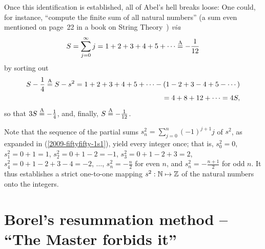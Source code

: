 Once this identification is established, all of Abel's hell breaks loose:
One could, for instance, ``compute the finite sum of all natural numbers''
(a sum even mentioned on page~22 in a book on String Theory~\cite{polchinski_1998}) {\it via}
\begin{equation}
S  =
\sum_{j=0}^\infty j = 1+2+3+4+5 + \cdots \stackrel{{\rm A}}{=} - \frac{1}{12}
\label{2016-m-ch-ds-natnumser}
\end{equation}
by sorting out
\begin{equation}
\begin{split}
S - \frac{1}{4}\stackrel{{\rm A}}{=}
S-s^2  = 1+2+3+4+5 + \cdots -
(1-2+3-4+5-\cdots )   \\
= 4 + 8+ 12 +  \cdots = 4 S
,
\label{2016-m-ch-ds-natnumser2}
\end{split}
\end{equation}
so that  $3 S
\stackrel{{\rm A}}{=}  - \frac{1}{4}$,
and, finally, $S
\stackrel{{\rm A}}{=}  - \frac{1}{12}$.

Note that the sequence of the partial sums $s^2_n=\sum_{j=0}^n (-1)^{j+1} j $
of $s^2$, as expanded in (\ref{2009-fiftyfifty-1s1}),
yield every integer once; that is,
$s^2_0 =0$,
$s^2_1 =0+1=1$,
$s^2_2 =0+1-2=-1$,
$s^2_3 =0+1-2+3=2$,
$s^2_4 =0+1-2+3-4=-2$,
$\ldots$,
$s^2_n =-\frac{n}{2}$ for even $n$,
and
$s^2_n =-\frac{n+1}{2}$ for odd $n$.
It thus establishes a strict one-to-one mapping
$s^2: {\Bbb N} \mapsto {\Bbb Z}$
of the natural numbers onto the integers.







\section{Borel's resummation method -- ``The Master forbids it''}

